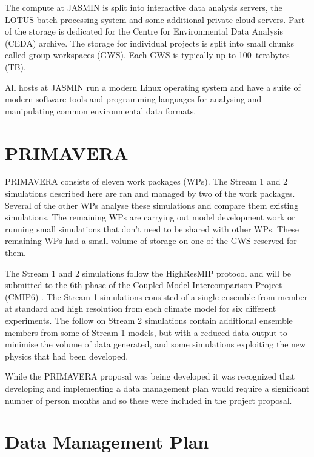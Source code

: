 \documentclass[gmd, manuscript]{copernicus}
\begin{document}
The compute at JASMIN is split into interactive data analysis servers, the LOTUS batch processing system and some additional private cloud servers. Part of the storage is dedicated for the Centre for Environmental Data Analysis (CEDA) archive. The storage for individual projects is split into small chunks called group workspaces (GWS). Each GWS is typically up to 100~terabytes (TB).

All hosts at JASMIN run a modern Linux operating system and have a suite of modern software tools and programming languages for analysing and manipulating common environmental data formats.

\section{PRIMAVERA}

PRIMAVERA consists of eleven work packages (WPs). The Stream 1 and 2 simulations described here are ran and managed by two of the work packages. Several of the other WPs analyse these simulations and compare them existing simulations. The remaining WPs are carrying out model development work or running small simulations that don't need to be shared with other WPs. These remaining WPs had a small volume of storage on one of the GWS reserved for them.

The Stream 1 and 2 simulations follow the HighResMIP protocol and will be submitted to the 6th phase of the Coupled Model Intercomparison Project (CMIP6) \citep{Eyring2016}. The Stream 1 simulations consisted of a single ensemble from member at standard and high resolution from each climate model for six different experiments. The follow on Stream 2 simulations contain additional ensemble members from some of Stream 1 models, but with a reduced data output to minimise the volume of data generated, and some simulations exploiting the new physics that had been developed.

While the PRIMAVERA proposal was being developed it was recognized that developing and implementing a data management plan would require a significant number of person months and so these were included in the project proposal.


\section{Data Management Plan}

\end{document}
